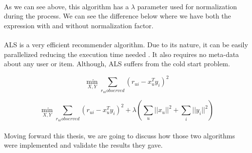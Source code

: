 \paragraph{}As we can see above, this algorithm has a $\lambda$ parameter used for normalization during the process. We can see the difference below where we have both the expression with and without normalization factor.

\paragraph{} ALS is a very efficient recommender algorithm. Due to its nature, it can be easily parallelized reducing the execution time needed \cite{DistributedAlgorithmsAndOptimization:4}. It also requires no meta-data about any user or item. Although, ALS suffers from the cold start problem.

\begin{equation}
\min_{X,Y} \sum_{r_{ui}observed}(r_{ui}-x_{u}^{T}y_{i})^{2}
\end{equation}

\begin{equation}
\min_{X,Y} \sum_{r_{ui}observed}(r_{ui}-x_{u}^{T}y_{i})^{2} + \lambda(\sum_{u}||x_{u}||^2 + \sum_{i}||y_{i}||^2)
\end{equation}

\paragraph{} Moving forward this thesis, we are going to discuss how those two algorithms were implemented and validate the results they gave.